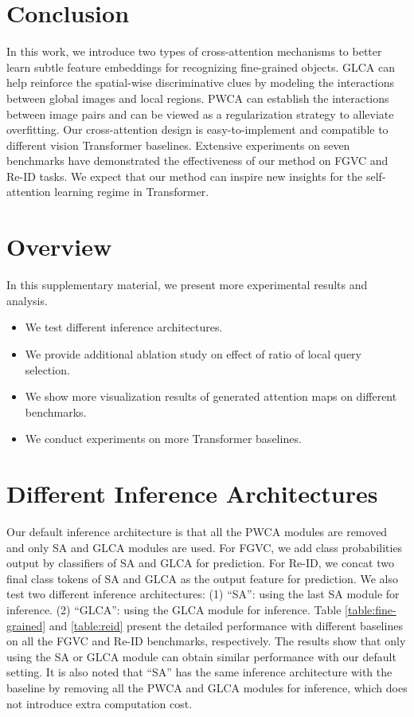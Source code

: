 \section{Conclusion}
In this work, we introduce two types of cross-attention mechanisms to better learn subtle feature embeddings for recognizing fine-grained objects. GLCA can help reinforce the spatial-wise discriminative clues by modeling the interactions between global images and local regions. PWCA can establish the interactions between image pairs and can be viewed as a regularization strategy to alleviate overfitting. Our cross-attention design is easy-to-implement and compatible to different vision Transformer baselines. Extensive experiments on seven benchmarks have demonstrated the effectiveness of our method on FGVC and Re-ID tasks. We expect that our method can inspire new insights for the self-attention learning regime in Transformer.

\clearpage
\appendix



\section{Overview}
In this supplementary material, we present more experimental results and analysis.
\begin{itemize}
    \item We test different inference architectures. 
    \item We provide additional ablation study on effect of ratio of local query selection.
    \item We show more visualization results of generated attention maps on different benchmarks. 
    \item We conduct experiments on more Transformer baselines.
\end{itemize}

\section{Different Inference Architectures}
Our default inference architecture is that all the PWCA modules are removed and only SA and GLCA modules are used. For FGVC, we add class probabilities output by classifiers of SA and GLCA for prediction. For Re-ID, we concat two final class tokens of SA and GLCA as the output feature for prediction. We also test two different inference architectures: (1) ``SA'': using the last SA module for inference. (2) ``GLCA'': using the GLCA module for inference. Table \ref{table:fine-grained} and \ref{table:reid} present the detailed performance with different baselines on all the FGVC and Re-ID benchmarks, respectively. The results show that only using the SA or GLCA module can obtain similar performance with our default setting. It is also noted that ``SA'' has the same inference architecture with the baseline by removing all the PWCA and GLCA modules for inference, which does not introduce extra computation cost.


